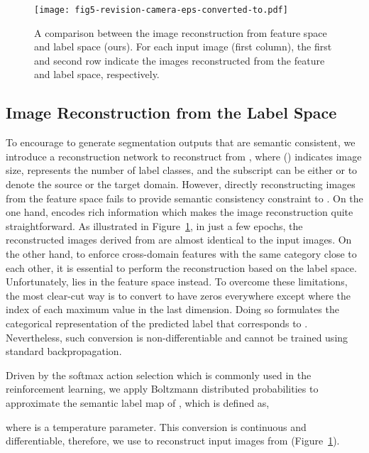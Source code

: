 \documentclass[runningheads]{llncs}
\begin{document}
	\begin{figure}[t]
		\begin{center}
			\texttt{[image: fig5-revision-camera-eps-converted-to.pdf]}
		\end{center}
		\caption{A comparison between the image reconstruction from feature space and label space (ours). For each input image (first column), the first and second row indicate the images reconstructed from the feature and label space, respectively.}
		\label{fig:reconstruction}
\end{figure}
	
	\subsection{Image Reconstruction from the Label Space}
	
	To encourage  to generate segmentation outputs that are semantic consistent, we introduce a reconstruction network  to reconstruct  from , where () indicates image size,  represents the number of label classes, and the subscript  can be either  or  to denote the source or the target domain. However, directly reconstructing images from the feature space fails to provide semantic consistency constraint to . On the one hand,  encodes rich information which makes the image reconstruction quite straightforward. As illustrated in Figure~\ref{fig:reconstruction}, in just a few epochs, the reconstructed images derived from  are almost identical to the input images. On the other hand, to enforce cross-domain features with the same category close to each other, it is essential to perform the reconstruction based on the label space. Unfortunately,  lies in the feature space instead. To overcome these limitations, the most clear-cut way is to convert  to have zeros everywhere except where the index of each maximum value in the last dimension. Doing so formulates the categorical representation of the predicted label that corresponds to . Nevertheless, such conversion is non-differentiable and cannot be trained using standard backpropagation.
	
	
	Driven by the softmax action selection which is commonly used in the reinforcement learning, we apply Boltzmann distributed probabilities to approximate the semantic label map of , which is defined as,
	
	where  is a temperature parameter. This conversion is continuous and differentiable, therefore, we use  to reconstruct input images  from  (Figure~\ref{fig:reconstruction}).
	
\end{document}
